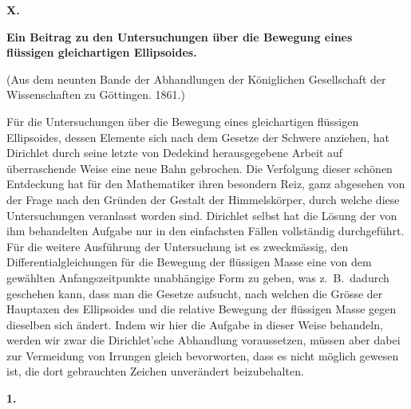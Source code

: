 \documentclass[12pt,a4paper]{article}
\begin{document}
\newpage
\begin{center}
\Large\textbf{X.}
\end{center}
\vspace{-0.5em}
\begin{center}
\Large\textbf{Ein Beitrag zu den Untersuchungen \"uber die Bewegung eines}\\[0.3em]
\Large\textbf{fl\"ussigen gleichartigen Ellipsoides.}
\end{center}
\vspace{0.3em}
\begin{center}
\small (Aus dem neunten Bande der Abhandlungen der K\"oniglichen Gesellschaft der\\
\small Wissenschaften zu G\"ottingen. 1861.)
\end{center}

\bigskip

F\"ur die Untersuchungen \"uber die Bewegung eines gleichartigen fl\"ussigen Ellipsoides, dessen Elemente sich nach dem Gesetze der Schwere anziehen, hat Dirichlet durch seine letzte von Dedekind herausgegebene Arbeit auf \"uberraschende Weise eine neue Bahn gebrochen. Die Verfolgung dieser sch\"onen Entdeckung hat f\"ur den Mathematiker ihren besondern Reiz, ganz abgesehen von der Frage nach den Gr\"unden der Gestalt der Himmelsk\"orper, durch welche diese Untersuchungen veranlasst worden sind. Dirichlet selbst hat die L\"osung der von ihm behandelten Aufgabe nur in den einfachsten F\"allen vollst\"andig durchgef\"uhrt. F\"ur die weitere Ausf\"uhrung der Untersuchung ist es zweckm\"assig, den Differentialgleichungen f\"ur die Bewegung der fl\"ussigen Masse eine von dem gew\"ahlten Anfangszeitpunkte unabh\"angige Form zu geben, was z.~B.~dadurch geschehen kann, dass man die Gesetze aufsucht, nach welchen die Gr\"osse der Hauptaxen des Ellipsoides und die relative Bewegung der fl\"ussigen Masse gegen dieselben sich \"andert. Indem wir hier die Aufgabe in dieser Weise behandeln, werden wir zwar die Dirichlet'sche Abhandlung voraussetzen, m\"ussen aber dabei zur Vermeidung von Irrungen gleich bevorworten, dass es nicht m\"oglich gewesen ist, die dort gebrauchten Zeichen unver\"andert beizubehalten.

\begin{center}
\textbf{1.}
\end{center}
\end{document}
